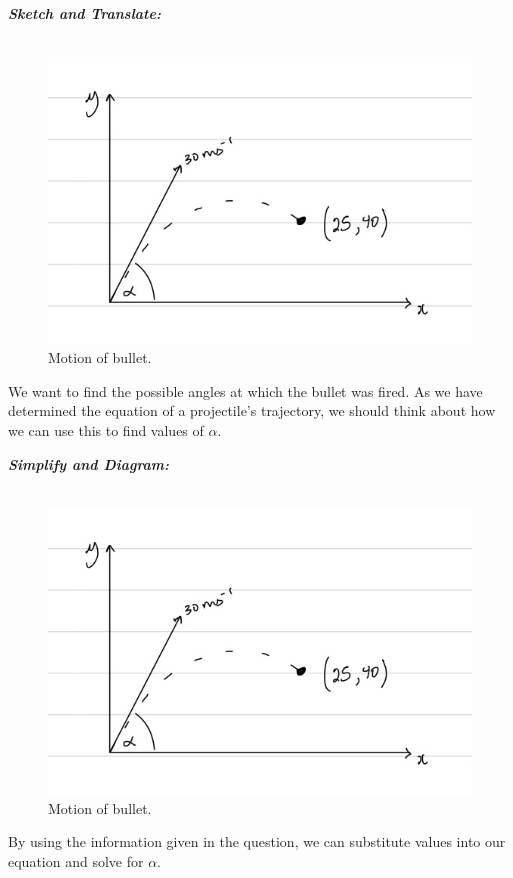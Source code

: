 \begin{subquestions}
\subquestion

\textbf{\textit{Sketch and Translate:}} \\ \\
\begin{figure}[H]
	\begin{center}
		\includegraphics[scale=0.25]{../2013/figures/2013q6-4}
		\caption{\label{2013:q6:Sketch4} Motion of bullet.}
	\end{center}
\end{figure}
We want to find the possible angles at which the bullet was fired. As we have determined the equation of a projectile's trajectory, we should think about how we can use this to find values of $\alpha$. 




\textbf{\textit{Simplify and Diagram:}} \\ \\
\begin{figure}[H]
	\begin{center}
		\includegraphics[scale=0.25]{../2013/figures/2013q6-4}
		\caption{\label{2013:q6:Diagram4} Motion of bullet.}
	\end{center}
\end{figure}
By using the information given in the question, we can substitute values into our equation and solve for $\alpha$.





\end{subquestions}
